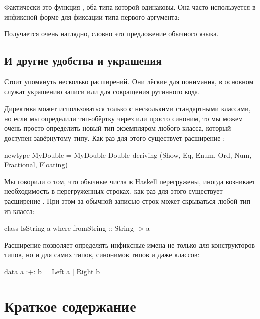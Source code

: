 Фактически это функция , оба типа которой одинаковы. Она часто
используется в инфиксной форме для фиксации типа первого аргумента:



Получается очень наглядно, словно это предложение обычного языка.

\subsection{И другие удобства и украшения}

Стоит упомянуть несколько расширений. Они лёгкие для понимания, в
основном служат украшению записи или для сокращения рутинного кода.

Директива  может использоваться только с несколькими
стандартными классами, но если мы определили тип-обёртку через
 или просто синоним, то мы можем очень просто определить
новый тип экземпляром любого класса, который доступен завёрнутому типу.
Как раз для этого существует расширение :


\begin{code}
newtype MyDouble = MyDouble Double
    deriving (Show, Eq, Enum, Ord, Num, Fractional, Floating)
\end{code}

Мы говорили о том, что обычные числа в Haskell перегружены, иногда
возникает необходимость в перегруженных строках, как раз для этого
существует расширение . При этом за обычной
записью строк может скрываться любой тип из класса:


\begin{code}
class IsString a where
    fromString :: String -> a
\end{code}

Расширение  позволяет определять инфиксные имена не
только для конструкторов типов, но и для самих типов, синонимов типов и
даже классов:


\begin{code}
data a :+: b = Left a | Right b
\end{code}

\section{Краткое содержание}

